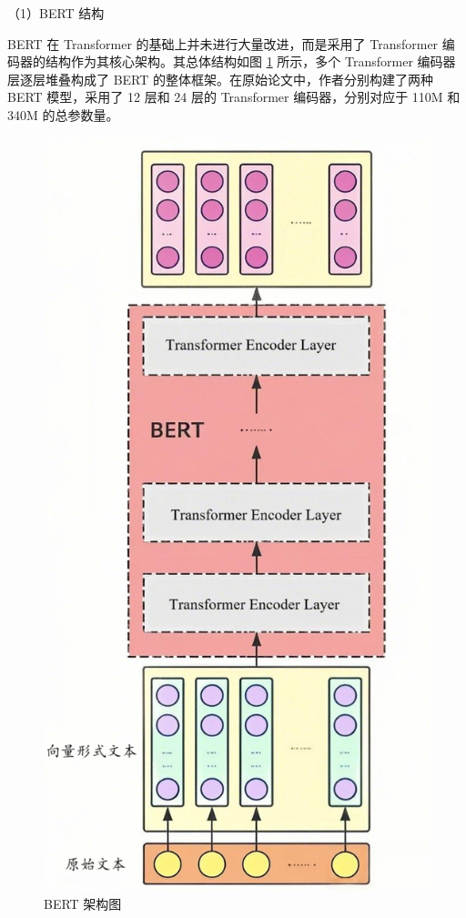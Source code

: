 （1）BERT 结构

BERT 在 Transformer 的基础上并未进行大量改进，而是采用了 Transformer 编码器的结构作为其核心架构。其总体结构如图 \ref{fig:BERT} 所示，多个 Transformer 编码器层逐层堆叠构成了 BERT 的整体框架。在原始论文中，作者分别构建了两种 BERT 模型，采用了 12 层和 24 层的 Transformer 编码器，分别对应于 110M 和 340M 的总参数量。

\begin{figure}[htb]
	\centering
	\includegraphics[scale = 0.5]{figures/bert.png}
	\caption{BERT 架构图 \cite{devlin_bert_2019}}
	\label{fig:BERT}
\end{figure}

